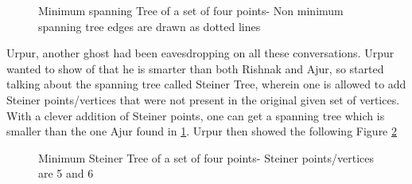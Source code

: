 \begin{figure}
\begin{center}
\caption{ Minimum spanning Tree of a set of four points- Non minimum spanning tree edges are drawn as dotted lines}\label{11g9}
\end{center}
\end{figure}

Urpur, another ghost had been eavesdropping on all these conversations. Urpur wanted to show of that he is smarter than both Rishnak and Ajur, so started talking about the spanning tree called Steiner Tree, wherein one is allowed to add Steiner points/vertices that were not present in the original given set of vertices. With a clever addition of Steiner points, one can get a spanning tree which is smaller than the one Ajur found in \ref{11g9}. Urpur then showed the following Figure \ref{11g10}

\begin{figure}
\begin{center}
\caption{ Minimum Steiner Tree of a set of four points- Steiner points/vertices are 5 and 6}\label{11g10}
\end{center}
\end{figure}

